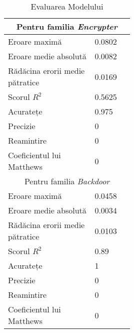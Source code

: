 \begin{table}[!htb]
    \centering
    \begin{tabular}{ | p{0.4\linewidth} | p{0.1\linewidth} | }
        \hline
        \multicolumn{2}{|c|}{Pentru familia \textit{Encrypter}} \\
        \hline
        Eroare maximă & 0.0802 \\
        Eroare medie absolută & 0.0082 \\
        Rădăcina erorii medie pătratice & 0.0169 \\
        Scorul $ R^2 $ & 0.5625 \\
        Acuratețe & 0.975 \\
        Precizie & 0 \\
        Reamintire & 0 \\
        Coeficientul lui Matthews & 0 \\
        \hline
        \multicolumn{2}{|c|}{Pentru familia \textit{Backdoor}} \\
        \hline
        Eroare maximă & 0.0458 \\
        Eroare medie absolută & 0.0034 \\
        Rădăcina erorii medie pătratice & 0.0103 \\
        Scorul $ R^2 $ & 0.89 \\
        Acuratețe & 1 \\
        Precizie & 0 \\
        Reamintire & 0 \\
        Coeficientul lui Matthews & 0 \\
        \hline
    \end{tabular}
    \caption{Evaluarea Modelului }
    \label{tab:pe_static_fast_classification_evaluation}
\end{table}